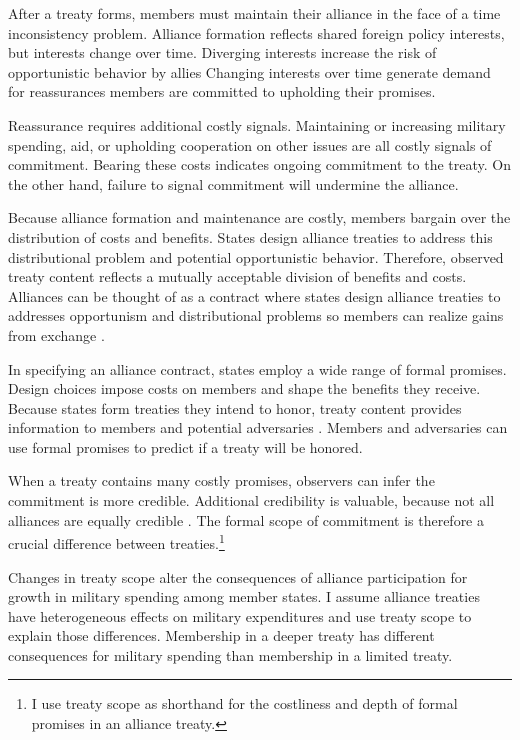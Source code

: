 \documentclass[12pt]{article}
\begin{document}
After a treaty forms, members must maintain their alliance in the face of a time inconsistency problem. 
Alliance formation reflects shared foreign policy interests, but interests change over time. 
Diverging interests increase the risk of opportunistic behavior by allies \citep{Leeds2003a, LeedsSavun2007}
Changing interests over time generate demand for reassurances members are committed to upholding their promises. 


Reassurance requires additional costly signals. 
Maintaining or increasing military spending, aid, or upholding cooperation on other issues are all costly signals of commitment. 
Bearing these costs indicates ongoing commitment to the treaty. 
On the other hand, failure to signal commitment will undermine the alliance. 


Because alliance formation and maintenance are costly, members bargain over the distribution of costs and benefits.
States design alliance treaties to address this distributional problem and potential opportunistic behavior. 
Therefore, observed treaty content reflects a mutually acceptable division of benefits and costs. 
Alliances can be thought of as a contract where states design alliance treaties to addresses opportunism and distributional problems \citep{Williamson1985, Koremenosetal2001} so members can realize gains from exchange \citep{Lake1996, Bensonetal2014}.


In specifying an alliance contract, states employ a wide range of formal promises. 
Design choices impose costs on members and shape the benefits they receive.
Because states form treaties they intend to honor, treaty content provides information to members and potential adversaries \citep{Leeds2003}. 
Members and adversaries can use formal promises to predict if a treaty will be honored.


When a treaty contains many costly promises, observers can infer the commitment is more credible. 
Additional credibility is valuable, because not all alliances are equally credible \citep{Benson2012}. 
The formal scope of commitment is therefore a crucial difference between treaties.\footnote{I use treaty scope as shorthand for the costliness and depth of formal promises in an alliance treaty.} 


Changes in treaty scope alter the consequences of alliance participation for growth in military spending among member states. 
I assume alliance treaties have heterogeneous effects on military expenditures and use treaty scope to explain those differences. 
Membership in a deeper treaty has different consequences for military spending than membership in a limited treaty. 
\end{document}
